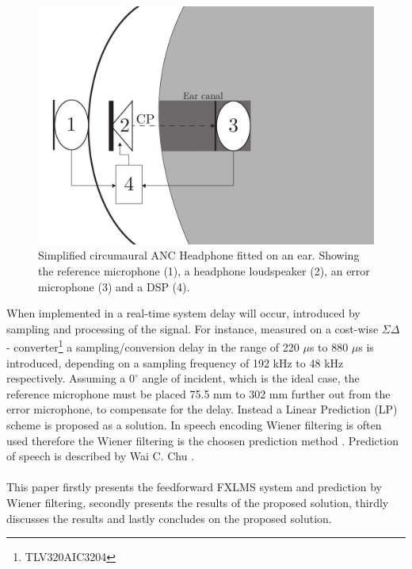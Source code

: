 \begin{figure}[H]
	\centering
	\includegraphics[width=1\columnwidth]{figures/ArticleIllustrations/BasicOverviewZoomed}
	\caption{Simplified circumaural ANC Headphone fitted on an ear. Showing the reference microphone (1), a headphone loudspeaker (2), an error microphone (3) and a DSP (4).}
	\label{fig:SystemOverview}
\end{figure}

When implemented in a real-time system delay will occur, introduced by sampling and processing of the signal. For instance, measured on a cost-wise $\Sigma\Delta$ - converter\footnote{TLV320AIC3204} a sampling/conversion delay in the range of 220 $\mu$s to 880 $\mu$s is introduced, depending on a sampling frequency of 192 kHz to 48 kHz respectively. Assuming a $\text{0}^{\circ}$ angle of incident, which is the ideal case, the reference microphone must be placed 75.5 mm to 302 mm further out from the error microphone, to compensate for the delay. Instead a Linear Prediction (LP) scheme is proposed as a solution. In speech encoding Wiener filtering is often used therefore the Wiener filtering is the choosen prediction method \cite{Speech}.
Prediction of speech is described by Wai C. Chu \cite{Speech}. 
\\\\
This paper firstly presents the feedforward FXLMS system and prediction by Wiener filtering, secondly presents the results of the proposed solution, thirdly discusses the results and lastly concludes on the proposed solution.
        
